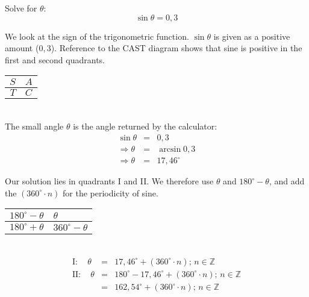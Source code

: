 \begin{wex}{}
{
Solve for $\theta$: 
\[\sin \theta = 0,3 \]
}
{
\begin{minipage}{0.7\textwidth}
We look at the sign of the trigonometric function. $\sin\theta$ is given as a positive amount ($0,3$). Reference to the CAST diagram shows that sine is positive in the first and second quadrants.
\end{minipage}
\begin{minipage}{0.3\textwidth}
\begin{center}
\begin{tabular}{r|l}
$S$ & $A$ \\
\hline
$T$ & $C$ 
\end{tabular}
\end{center}
\end{minipage}\\

The small angle $\theta$ is the angle returned by the calculator:
\begin{eqnarray*}
\sin \theta &= &0,3\\
\Rightarrow \theta &=& \arcsin 0,3 \\
\Rightarrow \theta &=& 17,46^\circ
\end{eqnarray*}

\begin{minipage}{0.65\textwidth}
Our solution lies in quadrants I and II. We therefore use $\theta$ and $180^\circ - \theta$, and add the $(360^\circ\cdot n)$ for the periodicity of sine.
\end{minipage}
\begin{minipage}{0.35\textwidth}
\begin{center}
\footnotesize
\begin{tabular}{r|l}
 $180^{\circ} - \theta$ & $\theta$ \\
\hline
 $180^{\circ} + \theta$ & $360^{\circ} - \theta$ 
\end{tabular}
\normalsize
\end{center}
\end{minipage}\\
\begin{eqnarray*}
\mathrm{I:} \quad \theta &=& 17,46^{\circ} + (360^{\circ}\cdot n)\mbox{; } n \in \mathbb{Z}  \\
\mathrm{II:} \quad \theta &=& 180^{\circ} - 17,46^{\circ} + (360^{\circ}\cdot n) \mbox{; } n \in \mathbb{Z} \\
&=& 162,54^{\circ} + (360^{\circ}\cdot n) \mbox{; } n \in \mathbb{Z}
\end{eqnarray*}

}
\end{wex}

